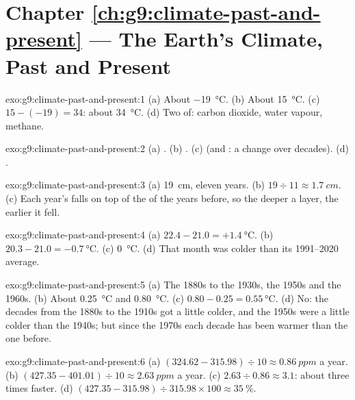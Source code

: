\section*{Chapter \ref{ch:g9:climate-past-and-present} --- The Earth's Climate, Past and Present}

\begin{solution}{exo:g9:climate-past-and-present:1}
(a) About \qty{-19}{\degreeCelsius}. (b) About \qty{15}{\degreeCelsius}.
(c) $15 - (-19) = 34$: about \qty{34}{\degreeCelsius}. (d) Two of:
carbon dioxide, water vapour, methane.
\end{solution}

\begin{solution}{exo:g9:climate-past-and-present:2}
(a) . (b) . (c)  (and : a change over
decades). (d) .
\end{solution}

\begin{solution}{exo:g9:climate-past-and-present:3}
(a) \qty{19}{cm}, eleven years. (b) $19 \div 11 \approx \qty{1.7}{cm}$.
(c) Each year's  falls on top of the  of the years before, so the
deeper a layer, the earlier it fell.
\end{solution}

\begin{solution}{exo:g9:climate-past-and-present:4}
(a) $22.4 - 21.0 = +\qty{1.4}{\degreeCelsius}$. (b) $20.3 - 21.0 =
\qty{-0.7}{\degreeCelsius}$. (c) \qty{0}{\degreeCelsius}. (d) That month
was colder than its 1991--2020 average.
\end{solution}

\begin{solution}{exo:g9:climate-past-and-present:5}
(a) The 1880s to the 1930s, the 1950s and the 1960s. (b) About
\qty{0.25}{\degreeCelsius} and \qty{0.80}{\degreeCelsius}. (c) $0.80 -
0.25 = \qty{0.55}{\degreeCelsius}$. (d) No: the decades from the 1880s to
the 1910s got a little colder, and the 1950s were a little colder than
the 1940s; but since the 1970s each decade has been warmer than the one
before.
\end{solution}

\begin{solution}{exo:g9:climate-past-and-present:6}
(a) $(324.62 - 315.98) \div 10 \approx \qty{0.86}{ppm}$ a year. (b)
$(427.35 - 401.01) \div 10 \approx \qty{2.63}{ppm}$ a year. (c) $2.63
\div 0.86 \approx 3.1$: about three times faster. (d) $(427.35 - 315.98)
\div 315.98 \times 100 \approx 35~\%$.
\end{solution}

